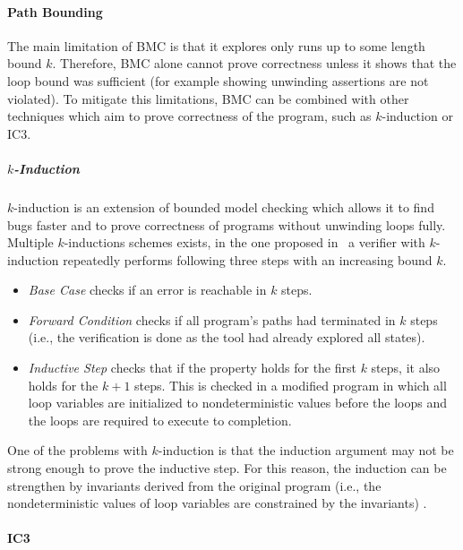 \paragraph{Path Bounding}

The main limitation of BMC is that it explores only runs up to some length
bound $k$.
Therefore, BMC alone cannot prove correctness unless it shows that the loop
bound was sufficient (for example showing unwinding assertions are not
violated).
To mitigate this limitations, BMC can be combined with other techniques which
aim to prove correctness of the program, such as $k$-induction or
IC3.

\subparagraph{$k$-Induction}

$k$-induction  is an extension of
bounded model checking which allows it to find bugs faster and to prove
correctness of programs without unwinding loops fully.
Multiple $k$-inductions schemes exists, in the one proposed in~ a verifier with $k$-induction repeatedly performs following three steps with an increasing bound $k$.
\begin{itemize}
    \item \emph{Base Case} checks if an error is reachable in $k$ steps.
    \item \emph{Forward Condition} checks if all program's paths had terminated in
        $k$ steps (i.e., the verification is done as the tool had already
        explored all states).
    \item \emph{Inductive Step} checks that if the property holds for the first $k$
        steps, it also holds for the $k+1$ steps.
        This is checked in a modified program in which all loop variables are
        initialized to nondeterministic values before the loops and the loops
        are required to execute to completion.
\end{itemize}
One of the problems with $k$-induction is that the induction argument may not be strong enough to prove the inductive step.
For this reason, the induction can be strengthen by invariants derived from the original program (i.e., the nondeterministic values of loop variables are constrained by the invariants) .

\paragraph{IC3} 

